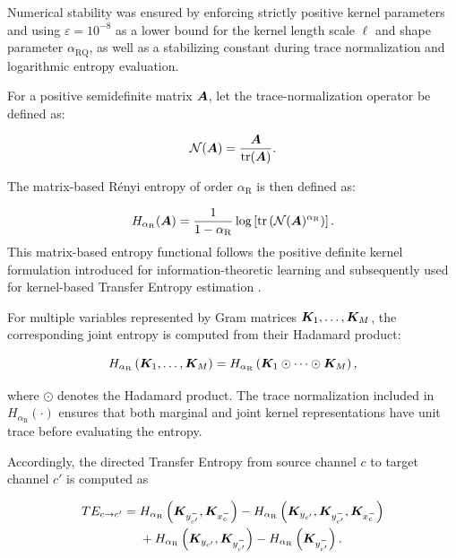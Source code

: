 {Numerical stability was ensured by enforcing strictly positive kernel parameters and using $\varepsilon=10^{-8}$ as a lower bound for the kernel length scale $\ell$ and shape parameter $\alpha_{\mathrm{RQ}}$, as well as a stabilizing constant during trace normalization and logarithmic entropy evaluation.}

For a positive semidefinite matrix ${\bm{A}}$, let the trace-normalization operator be defined as:

\begin{equation}
    \mathcal{N}({\bm{A}})
    =
    \frac{{\bm{A}}}
    {\operatorname{tr}({\bm{A}})}.
\end{equation}

The matrix-based R\'enyi entropy of order $\alpha_{\mathrm{R}}$ is then defined as:

\begin{equation}
    H_{\alpha_{\mathrm{R}}}({\bm{A}})
    =
    \frac{1}{1-\alpha_{\mathrm{R}}}
    \log
    \left[
        \operatorname{tr}
        \left(
            \mathcal{N}({\bm{A}})^{\alpha_{\mathrm{R}}}
        \right)
    \right].
\end{equation}
{This matrix-based entropy functional follows the positive definite kernel formulation introduced for information-theoretic learning and subsequently used for kernel-based Transfer Entropy estimation \cite{sanchezgiraldo2015entropy,delapava2019renyiTE}.}

For multiple variables represented by Gram matrices ${\bm{K}}_{1},\ldots,{\bm{K}}_{M}$, the corresponding joint entropy is computed from their Hadamard product:

\begin{equation}
    H_{\alpha_{\mathrm{R}}}
    \left(
        {\bm{K}}_{1},\ldots,{\bm{K}}_{M}
    \right)
    =
    H_{\alpha_{\mathrm{R}}}
    \left(
        {\bm{K}}_{1}
        \odot\cdots\odot
        {\bm{K}}_{M}
    \right),
\end{equation}

where $\odot$ denotes the Hadamard product. The trace normalization included in $H_{\alpha_{\mathrm{R}}}(\cdot)$ ensures that both marginal and joint kernel representations have unit trace before evaluating the entropy.

Accordingly, the directed Transfer Entropy from source channel $c$ to target channel $c'$ is computed as

\begin{align}
    TE_{c\rightarrow c'}
    ={}&
    H_{\alpha_{\mathrm{R}}}
    \left(
        {\bm{K}}_{y_{c'}^{-}},
        {\bm{K}}_{x_c^{-}}
    \right)
    -
    H_{\alpha_{\mathrm{R}}}
    \left(
        {\bm{K}}_{y_{c'}},
        {\bm{K}}_{y_{c'}^{-}},
        {\bm{K}}_{x_c^{-}}
    \right)
    \nonumber\\
    &+
    H_{\alpha_{\mathrm{R}}}
    \left(
        {\bm{K}}_{y_{c'}},
        {\bm{K}}_{y_{c'}^{-}}
    \right)
    -
    H_{\alpha_{\mathrm{R}}}
    \left(
        {\bm{K}}_{y_{c'}^{-}}
    \right).
\end{align}

